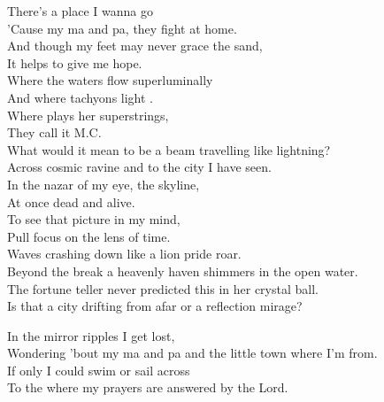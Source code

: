 
\label{album:flight-b741}




There's a place I wanna go \\
'Cause my ma and pa, they fight at home. \\
And though my feet may never grace the sand, \\
It helps to give me hope. \\
Where the waters flow superluminally \\
And where tachyons light . \\
Where  plays her superstrings, \\
They call it M.C. \\

What would it mean to be a beam travelling like lightning? \\
Across cosmic ravine and to the city I have seen. \\
In the nazar of my eye, the skyline, \\
At once dead and alive. \\
To see that picture in my mind, \\
Pull focus on the lens of time. \\

Waves crashing down like a lion pride roar. \\
Beyond the break a heavenly haven shimmers in the open water. \\
The fortune teller never predicted this in her crystal ball. \\
Is that a city drifting from afar or a reflection mirage? \\


In the mirror ripples I get lost, \\
Wondering 'bout my ma and pa and the little town where I'm from. \\
If only I could swim or sail across \\
To the  where my prayers are answered by the Lord. \\


